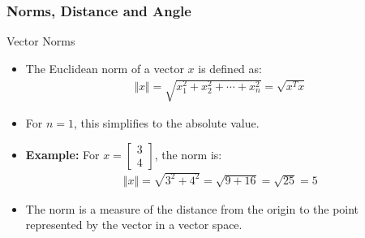 \subsubsection{Norms, Distance and Angle}
\begin{frame}{Vector Norms}
\begin{itemize}
        \item The Euclidean norm of a vector $x$ is defined as:
        \begin{align}
                \Vert x \Vert = \sqrt{x_1^2 + x_2^2 + \cdots + x_n^2} = \sqrt{x^T x} \label{eq2,9}
        \end{align}
        \item For $n=1$, this simplifies to the absolute value.
        \item \textbf{Example:} For $x = \begin{bmatrix} 3 \\ 4 \end{bmatrix}$, the norm is:
        \begin{align*}
                \Vert x \Vert = \sqrt{3^2 + 4^2} = \sqrt{9 + 16} = \sqrt{25} = 5
        \end{align*}
        \item The norm is a measure of the distance from the origin to the point represented by the vector in a vector space.
\end{itemize}
\end{frame}

